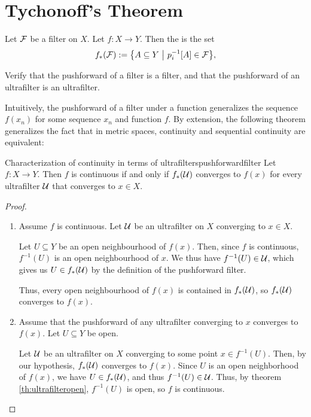 \section{Tychonoff's Theorem}
\begin{definition}
	Let $\mathcal{F}$ be a filter on $X$. Let $f : X \to Y$. Then the  is the set
	\begin{align*}
		f_*(\mathcal{F}) := \qty{A \subseteq Y ~\middle|~p_i^{-1}[A] \in \mathcal{F}},
	\end{align*}
\end{definition}
\begin{exercise}
	Verify that the pushforward of a filter is a filter, and that the pushforward of an ultrafilter is an ultrafilter.
\end{exercise}
Intuitively, the pushforward of a filter under a function generalizes the sequence $f(x_n)$ for some sequence $x_n$ and function $f$. By extension, the following theorem generalizes the fact that in metric spaces, continuity and sequential continuity are equivalent:
\begin{importanttheorem}{Characterization of continuity in terms of ultrafilters}{pushforwardfilter}
	Let $f : X \to Y$. Then $f$ is continuous if and only if $f_*(\mathcal{U})$ converges to $f(x)$ for every ultrafilter $\mathcal{U}$ that converges to $x \in X$.
\end{importanttheorem}
\begin{proof}
	\begin{enumerate}
		\item Assume $f$ is continuous. Let $\mathcal{U}$ be an ultrafilter on $X$ converging to $x \in X$. 
		
		Let $U \subseteq Y$ be an open neighbourhood of $f(x)$. Then, since $f$ is continuous, $f^{-1}(U)$ is an open neighbourhood of $x$. We thus have $f^{-1}(U) \in \mathcal{U}$, which gives us $U \in f_*(\mathcal{U})$ by the definition of the pushforward filter. 
		
		Thus, every open neighbourhood of $f(x)$ is contained in $f_*(\mathcal{U})$, so $f_*(\mathcal{U})$ converges to $f(x)$.
		
		\item Assume that the pushforward of any ultrafilter converging to $x$ converges to $f(x)$. Let $U \subseteq Y$ be open. 
		
		Let $\mathcal{U}$ be an ultrafilter on $X$ converging to some point $x \in f^{-1}(U)$. Then, by our hypothesis, $f_*(\mathcal{U})$ converges to $f(x)$. Since $U$ is an open neighborhood of $f(x)$, we have $U \in f_*(\mathcal{U})$, and thus $f^{-1}(U) \in \mathcal{U}$. Thus, by theorem \ref{th:ultrafilteropen}, $f^{-1}(U)$ is open, so $f$ is continuous.
	\end{enumerate}
\end{proof}
